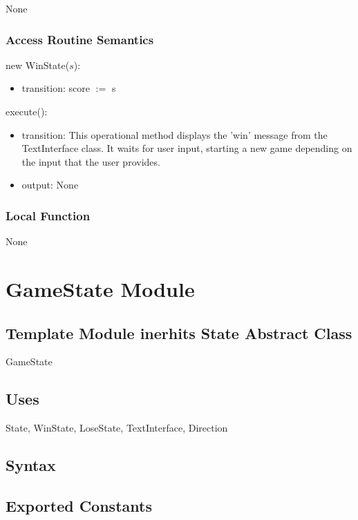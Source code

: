 \documentclass[12pt]{article}
\begin{document}
None

\subsubsection* {Access Routine Semantics}

\noindent new WinState($s$):
\begin{itemize}
\item transition: score $:=$ s
\end{itemize}

\noindent execute():
\begin{itemize}
\item transition: This operational method displays the 'win' message from the TextInterface class. It waits for user input, starting a new game depending on the input that the user provides.
\item output: None
\end{itemize}

\subsubsection* {Local Function}

None

\newpage

\section* {GameState Module}

\subsection* {Template Module inerhits State Abstract Class}

GameState

\subsection*{Uses}

State, WinState, LoseState, TextInterface, Direction

\subsection* {Syntax}

\subsection*{Exported Constants}
\end{document}
